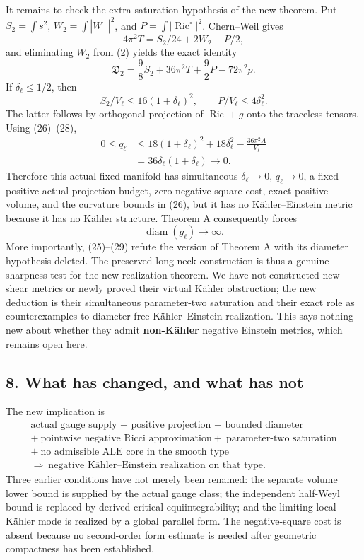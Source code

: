 \documentclass[
  11pt,
]{article}
\begin{document}
It remains to check the extra saturation hypothesis of the new theorem.
Put \(S_2=\int s^2\), \(W_2=\int|W^+|^2\), and
\(P=\int|\operatorname{Ric}^{\circ}|^2\). Chern--Weil gives \[
              4\pi^2T=S_2/24+2W_2-P/2,
\] and eliminating \(W_2\) from (2) yields the exact identity \[
 \mathfrak D_2
   =\frac98S_2+36\pi^2T+\frac92P-72\pi^2p.
 \tag{28}
\] If \(\delta_\ell\le1/2\), then \[
 S_2/V_\ell\le16(1+\delta_\ell)^2,
 \qquad P/V_\ell\le4\delta_\ell^2.
\] The latter follows by orthogonal projection of
\(\operatorname{Ric}+g\) onto the traceless tensors. Using (26)--(28),
\[
 \begin{split}
 0\le q_\ell
 &\le18(1+\delta_\ell)^2+18\delta_\ell^2
                                 -\frac{36\pi^2A}{V_\ell}\\
 &=36\delta_\ell(1+\delta_\ell)\longrightarrow0.
 \end{split}
 \tag{29}
\] Therefore this actual fixed manifold has simultaneous
\(\delta_\ell\to0\), \(q_\ell\to0\), a fixed positive actual projection
budget, zero negative-square cost, exact positive volume, and the
curvature bounds in (26), but it has no Kähler--Einstein metric because
it has no Kähler structure. Theorem A consequently forces \[
                         \operatorname{diam}(g_\ell)\to\infty.
 \tag{30}
\] More importantly, (25)--(29) refute the version of Theorem A with its
diameter hypothesis deleted. The preserved long-neck construction is
thus a genuine sharpness test for the new realization theorem. We have
not constructed new shear metrics or newly proved their virtual Kähler
obstruction; the new deduction is their simultaneous parameter-two
saturation and their exact role as counterexamples to diameter-free
Kähler--Einstein realization. This says nothing new about whether they
admit \textbf{non-Kähler} negative Einstein metrics, which remains open
here.

\hypertarget{what-has-changed-and-what-has-not}{%
\subsection{8. What has changed, and what has
not}\label{what-has-changed-and-what-has-not}}

The new implication is \[
 \boxed{
 \begin{gathered}
 \text{actual gauge supply + positive projection + bounded diameter}\\
 +\ \text{pointwise negative Ricci approximation}
 +\ \text{parameter-two saturation}\\
 +\ \text{no admissible ALE core in the smooth type}\\
 \Longrightarrow\ \text{negative Kähler–Einstein realization on that type}.
 \end{gathered}}
\] Three earlier conditions have not merely been renamed: the separate
volume lower bound is supplied by the actual gauge class; the
independent half-Weyl bound is replaced by derived critical
equiintegrability; and the limiting local Kähler mode is realized by a
global parallel form. The negative-square cost is absent because no
second-order form estimate is needed after geometric compactness has
been established.
\end{document}
